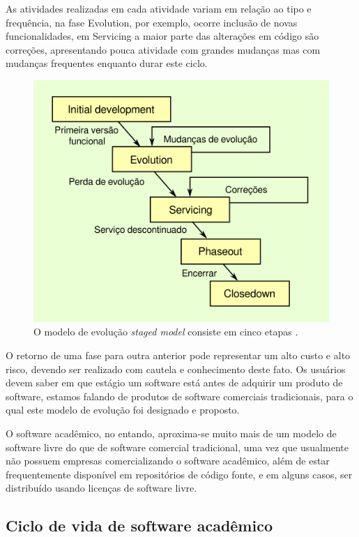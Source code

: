 As atividades realizadas em cada atividade variam em relação ao tipo e
frequência, na fase Evolution, por exemplo, ocorre inclusão de novas
funcionalidades, em Servicing a maior parte das alterações em código são
correções, apresentando pouca atividade com grandes mudanças mas com mudanças
frequentes enquanto durar este ciclo.

\begin{figure}[h]
  \center
  \includegraphics[scale=0.6]{imagens/staged-model-cycle.png}
  \caption{O modelo de evolução {\it staged model} consiste em cinco etapas \cite{rajlich2000staged}.}
  \label{staged-model-cycle}
\end{figure}

O retorno de uma fase para outra anterior pode representar um alto custo e alto
risco, devendo ser realizado com cautela e conhecimento deste fato. Os
usuários devem saber em que estágio um software está antes de adquirir um
produto de software, estamos falando de produtos de software comerciais
tradicionais, para o qual este modelo de evolução foi designado e proposto.

O software acadêmico, no entando, aproxima-se muito mais de um modelo de
software livre do que de software comercial tradicional, uma vez que usualmente
não possuem empresas comercializando o software acadêmico, além de estar
frequentemente disponível em repositórios de código fonte, e em
alguns casos, ser distribuído usando licenças de software livre.

\subsection{Ciclo de vida de software acadêmico}

